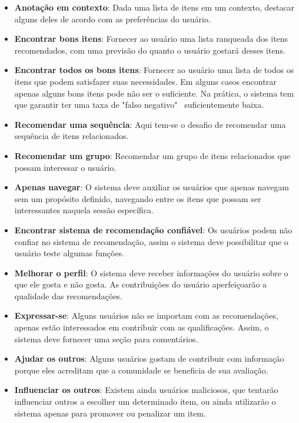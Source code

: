 \begin{itemize}
	\item{\textbf{Anotação em contexto}: Dada uma lista de itens em um contexto, destacar alguns deles de acordo com as preferências do usuário.}
		
	\item{\textbf{Encontrar bons itens}: Fornecer ao usuário uma lista ranqueada dos itens recomendados, com uma previsão do quanto o usuário gostará desses itens.}
	
	\item{\textbf{Encontrar todos os bons itens}: Fornecer ao usuário uma lista de todos os itens que podem satisfazer suas necessidades. Em alguns casos encontrar apenas alguns bons itens pode não ser o suficiente. Na prática, o sistema tem que garantir ter uma taxa de "falso negativo"~ suficientemente baixa.}
	
	\item{\textbf{Recomendar uma sequência}: Aqui tem-se o desafio de recomendar uma sequência de itens relacionados.}
	
	\item{\textbf{Recomendar um grupo}: Recomendar um grupo de itens relacionados que possam interessar o usuário.}
	
	\item{\textbf{Apenas navegar}: O sistema deve auxiliar os usuários que apenas navegam sem um propósito definido, navegando entre os itens que possam ser interessantes naquela sessão específica.}
	
	\item{\textbf{Encontrar sistema de recomendação confiável}: Os usuários podem não confiar no sistema de recomendação, assim o sistema deve possibilitar que o usuário teste algumas funções.}
	
	\item{\textbf{Melhorar o perfil}: O sistema deve receber informações do usuário sobre o que ele gosta e não gosta. As contribuições do usuário aperfeiçoarão a qualidade das recomendações.}
	
	\item{\textbf{Expressar-se}: Alguns usuários não se importam com as recomendações, apenas estão interessados em contribuir com as qualificações. Assim, o sistema deve fornecer uma seção para comentários.}
	
	\item{\textbf{Ajudar os outros}: Alguns usuários gostam de contribuir com informação porque eles acreditam que a comunidade se beneficia de sua avaliação.}
	
	\item{\textbf{Influenciar os outros}: Existem ainda usuários maliciosos, que tentarão influenciar outros a escolher um determinado item, ou ainda utilizarão o sistema apenas para promover ou penalizar um item.}
\end{itemize}

